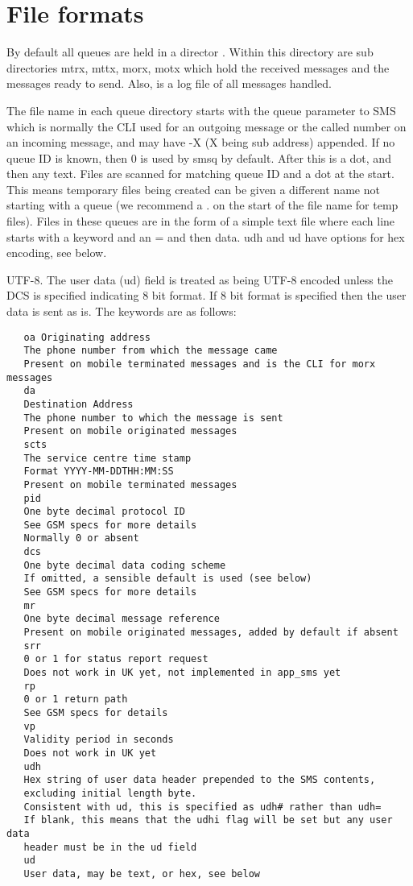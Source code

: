 \section{File formats}

   By default all queues are held in a director .
   Within this directory are sub directories mtrx, mttx, morx, motx which
   hold the received messages and the messages ready to send. Also,
    is a log file of all messages handled.

   The file name in each queue directory starts with the queue parameter
   to SMS which is normally the CLI used for an outgoing message or the
   called number on an incoming message, and may have -X (X being sub
   address) appended. If no queue ID is known, then 0 is used by smsq by
   default. After this is a dot, and then any text. Files are scanned for
   matching queue ID and a dot at the start. This means temporary files
   being created can be given a different name not starting with a queue
   (we recommend a . on the start of the file name for temp files).
   Files in these queues are in the form of a simple text file where each
   line starts with a keyword and an = and then data. udh and ud have
   options for hex encoding, see below.

   UTF-8. The user data (ud) field is treated as being UTF-8 encoded
   unless the DCS is specified indicating 8 bit format. If 8 bit format
   is specified then the user data is sent as is.
   The keywords are as follows:
\begin{verbatim}
   oa Originating address
   The phone number from which the message came
   Present on mobile terminated messages and is the CLI for morx messages
   da
   Destination Address
   The phone number to which the message is sent
   Present on mobile originated messages
   scts
   The service centre time stamp
   Format YYYY-MM-DDTHH:MM:SS
   Present on mobile terminated messages
   pid
   One byte decimal protocol ID
   See GSM specs for more details
   Normally 0 or absent
   dcs
   One byte decimal data coding scheme
   If omitted, a sensible default is used (see below)
   See GSM specs for more details
   mr
   One byte decimal message reference
   Present on mobile originated messages, added by default if absent
   srr
   0 or 1 for status report request
   Does not work in UK yet, not implemented in app_sms yet
   rp
   0 or 1 return path
   See GSM specs for details
   vp
   Validity period in seconds
   Does not work in UK yet
   udh
   Hex string of user data header prepended to the SMS contents,
   excluding initial length byte.
   Consistent with ud, this is specified as udh# rather than udh=
   If blank, this means that the udhi flag will be set but any user data
   header must be in the ud field
   ud
   User data, may be text, or hex, see below
\end{verbatim}

